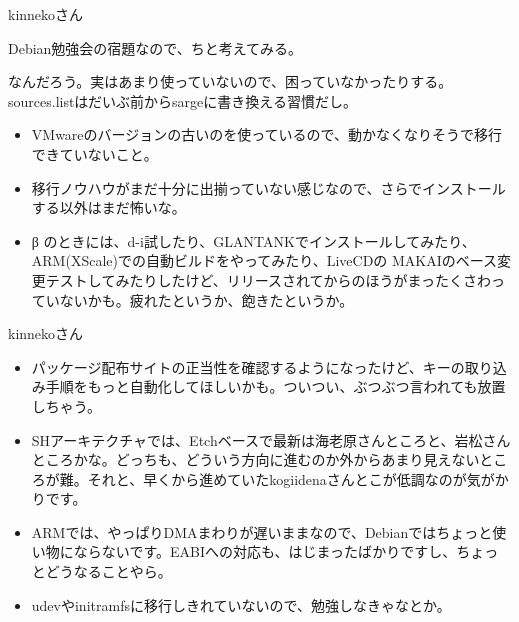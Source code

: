 \documentclass[cjk,dvipdfmx,12pt]{beamer}
\begin{document}
\begin{frame}{kinnekoさん}

Debian勉強会の宿題なので、ちと考えてみる。

なんだろう。実はあまり使っていないので、困っていなかったりする。
sources.listはだいぶ前からsargeに書き換える習慣だし。

\begin{itemize}
 
 \item VMwareのバージョンの古いのを使っているので、動かなくなりそうで移行できていないこと。

 \item 移行ノウハウがまだ十分に出揃っていない感じなので、さらでインストールする以外はまだ怖いな。

 \item β のときには、d-i試したり、GLANTANKでインストールしてみたり、ARM(XScale)での自動ビルドをやってみたり、LiveCDの
 MAKAIのベース変更テストしてみたりしたけど、リリースされてからのほうがまったくさわっていないかも。疲れたというか、飽きたというか。

\end{itemize}
\end{frame}
\begin{frame}{kinnekoさん}
\begin{itemize}
 \item パッケージ配布サイトの正当性を確認するようになったけど、キーの取り込み手順をもっと自動化してほしいかも。ついつい、ぶつぶつ言われても放置しちゃう。

 \item SHアーキテクチャでは、Etchベースで最新は海老原さんところと、岩松さんところかな。どっちも、どういう方向に進むのか外からあまり見えないところが難。それと、早くから進めていたkogiidenaさんとこが低調なのが気がかりです。

 \item ARMでは、やっぱりDMAまわりが遅いままなので、Debianではちょっと使い物にならないです。EABIへの対応も、はじまったばかりですし、ちょっとどうなることやら。

 \item udevやinitramfsに移行しきれていないので、勉強しなきゃなとか。

\end{itemize}
\end{frame}
\end{document}
